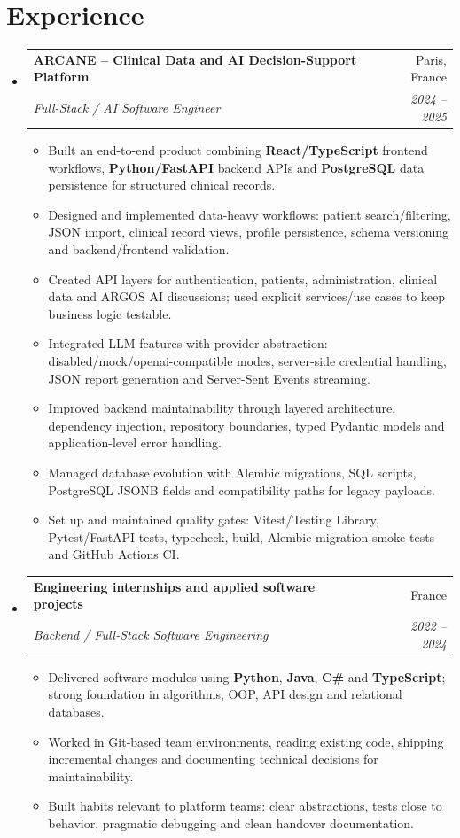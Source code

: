 \documentclass[letterpaper,11pt]{article}
\makeatletter
\newcommand{\resumeItem}[1]{\item\small{#1 \vspace{-2pt}}}
\newcommand{\resumeSubheading}[4]{
  \vspace{-2pt}\item
    \begin{tabular*}{0.97\textwidth}[t]{l@{\extracolsep{\fill}}r}
      \textbf{#1} & #2 \\
      \textit{\small#3} & \textit{\small #4} \\
    \end{tabular*}\vspace{-7pt}
}
\newcommand{\resumeSubHeadingListStart}{\begin{itemize}[leftmargin=0.15in, label={}]}
\newcommand{\resumeSubHeadingListEnd}{\end{itemize}}
\newcommand{\resumeItemListStart}{\begin{itemize}[leftmargin=0.18in]}
\newcommand{\resumeItemListEnd}{\end{itemize}\vspace{-5pt}}
\makeatother
\begin{document}
\section{Experience}
\resumeSubHeadingListStart
  \resumeSubheading
    {ARCANE -- Clinical Data and AI Decision-Support Platform}{Paris, France}
    {Full-Stack / AI Software Engineer}{2024 -- 2025}
    \resumeItemListStart
      \resumeItem{Built an end-to-end product combining \textbf{React/TypeScript} frontend workflows, \textbf{Python/FastAPI} backend APIs and \textbf{PostgreSQL} data persistence for structured clinical records.}
      \resumeItem{Designed and implemented data-heavy workflows: patient search/filtering, JSON import, clinical record views, profile persistence, schema versioning and backend/frontend validation.}
      \resumeItem{Created API layers for authentication, patients, administration, clinical data and ARGOS AI discussions; used explicit services/use cases to keep business logic testable.}
      \resumeItem{Integrated LLM features with provider abstraction: disabled/mock/openai-compatible modes, server-side credential handling, JSON report generation and Server-Sent Events streaming.}
      \resumeItem{Improved backend maintainability through layered architecture, dependency injection, repository boundaries, typed Pydantic models and application-level error handling.}
      \resumeItem{Managed database evolution with Alembic migrations, SQL scripts, PostgreSQL JSONB fields and compatibility paths for legacy payloads.}
      \resumeItem{Set up and maintained quality gates: Vitest/Testing Library, Pytest/FastAPI tests, typecheck, build, Alembic migration smoke tests and GitHub Actions CI.}
    \resumeItemListEnd

  \resumeSubheading
    {Engineering internships and applied software projects}{France}
    {Backend / Full-Stack Software Engineering}{2022 -- 2024}
    \resumeItemListStart
      \resumeItem{Delivered software modules using \textbf{Python}, \textbf{Java}, \textbf{C\#} and \textbf{TypeScript}; strong foundation in algorithms, OOP, API design and relational databases.}
      \resumeItem{Worked in Git-based team environments, reading existing code, shipping incremental changes and documenting technical decisions for maintainability.}
      \resumeItem{Built habits relevant to platform teams: clear abstractions, tests close to behavior, pragmatic debugging and clean handover documentation.}
    \resumeItemListEnd
\resumeSubHeadingListEnd
\end{document}
